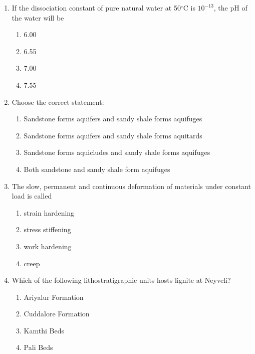 \documentclass[journal,12pt,onecolumn]{IEEEtran}
\theoremstyle{remark}
\begin{document}
\begin{enumerate}[resume]
\item If the dissociation constant of pure natural water at 50\(^\circ\)C is \(10^{-13}\), the pH of the water will be
\begin{multicols}{4}
\begin{enumerate}
\item 6.00  
\item 6.55  
\item 7.00  
\item 7.55  
\end{enumerate}
\end{multicols}

\item Choose the correct statement:
\begin{enumerate}
\item Sandstone forms aquifers and sandy shale forms aquifuges  
\item Sandstone forms aquifers and sandy shale forms aquitards  
\item Sandstone forms aquicludes and sandy shale forms aquifuges  
\item Both sandstone and sandy shale form aquifuges  
\end{enumerate}

\item The slow, permanent and continuous deformation of materials under constant load is called
\begin{multicols}{4}
\begin{enumerate}
\item strain hardening  
\item stress stiffening  
\item work hardening  
\item creep  
\end{enumerate}
\end{multicols}

\item Which of the following lithostratigraphic units hosts lignite at Neyveli?
\begin{multicols}{2}
\begin{enumerate}
\item Ariyalur Formation  
\item Cuddalore Formation  
\item Kamthi Beds  
\item Pali Beds  
\end{enumerate}
\end{multicols}


\end{enumerate}
\end{document}
